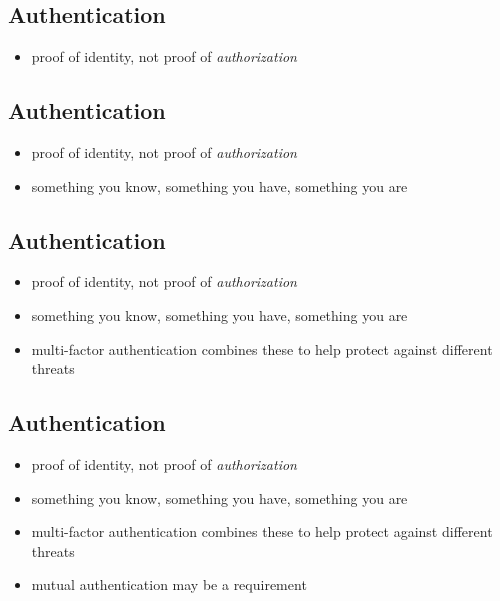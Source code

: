 \documentclass[xga]{xdvislides}
\begin{document}
%
\subsection{Authentication}

\begin{itemize}
	\item proof of identity, not proof of {\em authorization}
\end{itemize}

\subsection{Authentication}

\begin{itemize}
	\item proof of identity, not proof of {\em authorization}
	\item something you know, something you have, something you are
\end{itemize}

\subsection{Authentication}

\begin{itemize}
	\item proof of identity, not proof of {\em authorization}
	\item something you know, something you have, something you are
	\item multi-factor authentication combines these to help protect against different threats
\end{itemize}

\subsection{Authentication}

\begin{itemize}
	\item proof of identity, not proof of {\em authorization}
	\item something you know, something you have, something you are
	\item multi-factor authentication combines these to help protect against different threats
	\item mutual authentication may be a requirement
\end{itemize}
\end{document}
